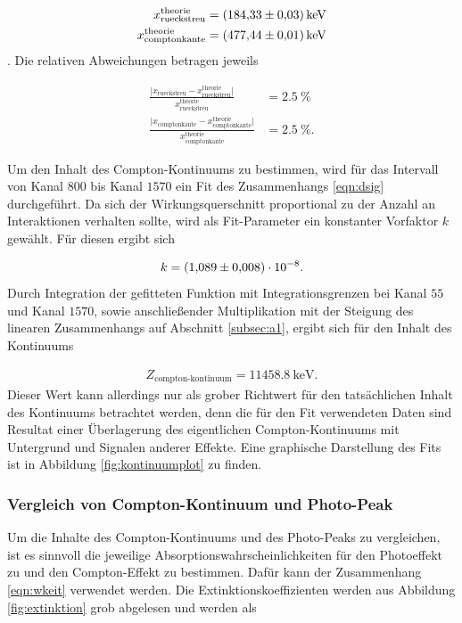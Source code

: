 \begin{align*}
  x_\text{rueckstreu}^\text{theorie} = \SI{184.33+-0.03}{\kilo\electronvolt}\\
  x_\text{comptonkante}^\text{theorie} = \SI{477.44+-0.01}{\kilo\electronvolt}
\end{align*}.
Die relativen Abweichungen betragen jeweils

\begin{align*}
  \frac{\lvert x_\text{rueckstreu} - x_\text{rueckstreu}^\text{theorie} \rvert}{x_\text{rueckstreu}^\text{theorie}} &= \SI{2.5}{\percent}\\
  \frac{\lvert x_\text{comptonkante} - x_\text{comptonkante}^\text{theorie} \rvert}{x_\text{comptonkante}^\text{theorie}} &= \SI{2.5}{\percent}.
\end{align*}

Um den Inhalt des Compton-Kontinuums zu bestimmen, wird für das Intervall von Kanal $800$ bis Kanal $1570$ ein
Fit des Zusammenhangs \eqref{eqn:dsig} durchgeführt. Da sich der Wirkungsquerschnitt proportional zu
der Anzahl an Interaktionen verhalten sollte, wird als Fit-Parameter ein konstanter Vorfaktor $k$ gewählt. Für diesen ergibt
sich

\begin{align*}
  k = \SI{1.089+-0.008 e-8}{}.
\end{align*}
Durch Integration der gefitteten Funktion mit Integrationsgrenzen bei Kanal $55$ und Kanal $1570$, sowie anschließender
Multiplikation mit der Steigung des linearen Zusammenhangs auf Abschnitt \ref{subsec:a1}, ergibt sich für den Inhalt des
Kontinuums

\begin{align*}
  Z_\text{compton-kontinuum} = \SI{11458.8}{\kilo\electronvolt}.
\end{align*}
Dieser Wert kann allerdings nur als grober Richtwert für den tatsächlichen Inhalt des Kontinuums betrachtet werden,
denn die für den Fit verwendeten Daten sind Resultat einer Überlagerung des eigentlichen Compton-Kontinuums mit
Untergrund und Signalen anderer Effekte. Eine graphische Darstellung des Fits ist in Abbildung \ref{fig:kontinuumplot}
zu finden.
\FloatBarrier
\subsubsection{Vergleich von Compton-Kontinuum und Photo-Peak}
\label{subsubsec:a23}
Um die Inhalte des Compton-Kontinuums und des Photo-Peaks zu vergleichen, ist es sinnvoll die jeweilige Absorptionswahrscheinlichkeiten für den Photoeffekt zu
und den Compton-Effekt zu bestimmen. Dafür kann der Zusammenhang \eqref{eqn:wkeit} verwendet werden.
Die Extinktionskoeffizienten werden aus Abbildung \ref{fig:extinktion} grob abgelesen und werden als

